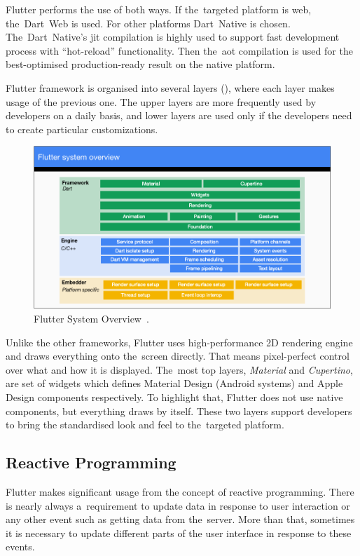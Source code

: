 Flutter performs the use of both ways. If the~targeted platform is web, the~Dart~Web is used. For other platforms Dart~Native is chosen. The~Dart~Native's \gls{jit} compilation is highly used to support fast development process with ``hot-reload'' functionality. Then the~\gls{aot} compilation is used for the best-optimised production-ready result on the native platform.  

Flutter framework is organised into several layers (), where each layer makes usage of the previous one. The upper layers are more frequently used by developers on a daily basis, and lower layers are used only if the developers need to create particular customizations.

\begin{figure}[htp]
    \centering
    \includegraphics[width=\linewidth]{img/flutter/flutter-layer-cake.png}
    \caption{Flutter System Overview~\cite{flutter-technical-overview}.}
    \label{fig:flutter-layer-cake}
\end{figure}

Unlike the other frameworks, Flutter uses high-performance 2D rendering engine and draws everything onto the~screen directly. That means pixel-perfect control over what and how it is displayed. The~most top layers, \textit{Material} and \textit{Cupertino}, are set of widgets which defines Material Design (Android systems) and Apple Design components respectively. To highlight that, Flutter does not use native components, but everything draws by itself. These two layers support developers to bring the standardised look and feel to the~targeted platform.
\subsection{Reactive Programming}
Flutter makes significant usage from the concept of reactive programming. There is nearly always a~requirement to update data in response to user interaction or any other event such as getting data from the~server. More than that, sometimes it is necessary to update different parts of the user interface in response to these events. 

